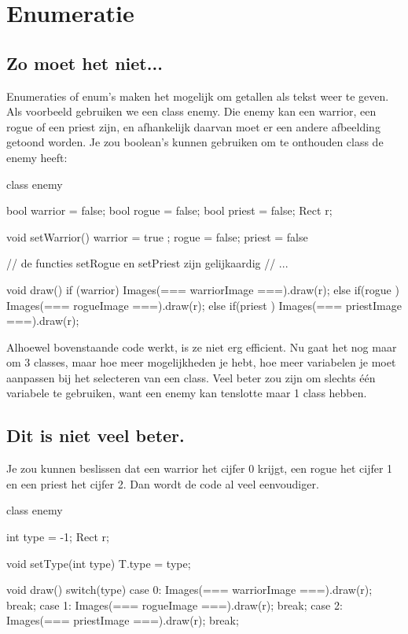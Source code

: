 \chapter{Enumeratie}
\section{Zo moet het niet...}
Enumeraties of enum's maken het mogelijk om getallen als tekst weer te geven. Als voorbeeld gebruiken we een class enemy. Die enemy kan een warrior, een rogue of een priest zijn, en afhankelijk daarvan moet er een andere afbeelding getoond worden. Je zou boolean's kunnen gebruiken om te onthouden class de enemy heeft:

\begin{code}
class enemy {
  bool warrior = false;
	bool rogue   = false;
	bool priest  = false;
	Rect r;
	
	void setWarrior() {
		warrior = true ;
		rogue   = false;
		priest  = false
	}
	
	// de functies setRogue en setPriest zijn gelijkaardig
	// ...
	
	void draw() {
	  if     (warrior) Images(=== warriorImage ===).draw(r);
		else if(rogue  ) Images(=== rogueImage   ===).draw(r);
		else if(priest ) Images(=== priestImage  ===).draw(r);
	}}
\end{code}

Alhoewel bovenstaande code werkt, is ze niet erg efficient. Nu gaat het nog maar om 3 classes, maar hoe meer mogelijkheden je hebt, hoe meer variabelen je moet aanpassen bij het selecteren van een class. Veel beter zou zijn om slechts \'e\'en variabele te gebruiken, want een enemy kan tenslotte maar 1 class hebben.

\section{Dit is niet veel beter.}
Je zou kunnen beslissen dat een warrior het cijfer 0 krijgt, een rogue het cijfer 1 en een priest het cijfer 2. Dan wordt de code al veel eenvoudiger.

\begin{code}
class enemy {
  int type = -1;
	Rect r;
	
	void setType(int type) {
		T.type = type;
	}
	
	void draw() {
		switch(type) {
			case 0: Images(=== warriorImage ===).draw(r); break;
			case 1: Images(=== rogueImage   ===).draw(r); break;
			case 2: Images(=== priestImage  ===).draw(r); break;
	  }
	}
}
\end{code}

